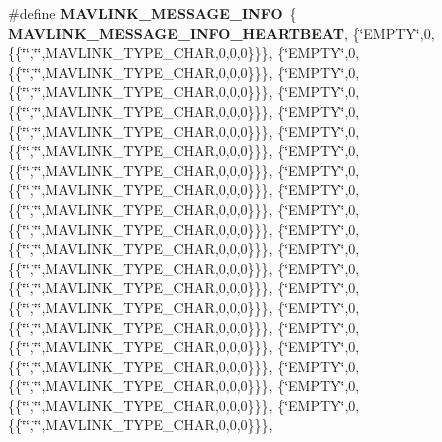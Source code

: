 \begin{DoxyCompactItemize}
\#define \textbf{ M\+A\+V\+L\+I\+N\+K\+\_\+\+M\+E\+S\+S\+A\+G\+E\+\_\+\+I\+N\+FO}~\{\textbf{ M\+A\+V\+L\+I\+N\+K\+\_\+\+M\+E\+S\+S\+A\+G\+E\+\_\+\+I\+N\+F\+O\+\_\+\+H\+E\+A\+R\+T\+B\+E\+AT}, \{\char`\"{}E\+M\+P\+TY\char`\"{},0,\{\{\char`\"{}\char`\"{},\char`\"{}\char`\"{},M\+A\+V\+L\+I\+N\+K\+\_\+\+T\+Y\+P\+E\+\_\+\+C\+H\+AR,0,0,0\}\}\}, \{\char`\"{}E\+M\+P\+TY\char`\"{},0,\{\{\char`\"{}\char`\"{},\char`\"{}\char`\"{},M\+A\+V\+L\+I\+N\+K\+\_\+\+T\+Y\+P\+E\+\_\+\+C\+H\+AR,0,0,0\}\}\}, \{\char`\"{}E\+M\+P\+TY\char`\"{},0,\{\{\char`\"{}\char`\"{},\char`\"{}\char`\"{},M\+A\+V\+L\+I\+N\+K\+\_\+\+T\+Y\+P\+E\+\_\+\+C\+H\+AR,0,0,0\}\}\}, \{\char`\"{}E\+M\+P\+TY\char`\"{},0,\{\{\char`\"{}\char`\"{},\char`\"{}\char`\"{},M\+A\+V\+L\+I\+N\+K\+\_\+\+T\+Y\+P\+E\+\_\+\+C\+H\+AR,0,0,0\}\}\}, \{\char`\"{}E\+M\+P\+TY\char`\"{},0,\{\{\char`\"{}\char`\"{},\char`\"{}\char`\"{},M\+A\+V\+L\+I\+N\+K\+\_\+\+T\+Y\+P\+E\+\_\+\+C\+H\+AR,0,0,0\}\}\}, \{\char`\"{}E\+M\+P\+TY\char`\"{},0,\{\{\char`\"{}\char`\"{},\char`\"{}\char`\"{},M\+A\+V\+L\+I\+N\+K\+\_\+\+T\+Y\+P\+E\+\_\+\+C\+H\+AR,0,0,0\}\}\}, \{\char`\"{}E\+M\+P\+TY\char`\"{},0,\{\{\char`\"{}\char`\"{},\char`\"{}\char`\"{},M\+A\+V\+L\+I\+N\+K\+\_\+\+T\+Y\+P\+E\+\_\+\+C\+H\+AR,0,0,0\}\}\}, \{\char`\"{}E\+M\+P\+TY\char`\"{},0,\{\{\char`\"{}\char`\"{},\char`\"{}\char`\"{},M\+A\+V\+L\+I\+N\+K\+\_\+\+T\+Y\+P\+E\+\_\+\+C\+H\+AR,0,0,0\}\}\}, \{\char`\"{}E\+M\+P\+TY\char`\"{},0,\{\{\char`\"{}\char`\"{},\char`\"{}\char`\"{},M\+A\+V\+L\+I\+N\+K\+\_\+\+T\+Y\+P\+E\+\_\+\+C\+H\+AR,0,0,0\}\}\}, \{\char`\"{}E\+M\+P\+TY\char`\"{},0,\{\{\char`\"{}\char`\"{},\char`\"{}\char`\"{},M\+A\+V\+L\+I\+N\+K\+\_\+\+T\+Y\+P\+E\+\_\+\+C\+H\+AR,0,0,0\}\}\}, \{\char`\"{}E\+M\+P\+TY\char`\"{},0,\{\{\char`\"{}\char`\"{},\char`\"{}\char`\"{},M\+A\+V\+L\+I\+N\+K\+\_\+\+T\+Y\+P\+E\+\_\+\+C\+H\+AR,0,0,0\}\}\}, \{\char`\"{}E\+M\+P\+TY\char`\"{},0,\{\{\char`\"{}\char`\"{},\char`\"{}\char`\"{},M\+A\+V\+L\+I\+N\+K\+\_\+\+T\+Y\+P\+E\+\_\+\+C\+H\+AR,0,0,0\}\}\}, \{\char`\"{}E\+M\+P\+TY\char`\"{},0,\{\{\char`\"{}\char`\"{},\char`\"{}\char`\"{},M\+A\+V\+L\+I\+N\+K\+\_\+\+T\+Y\+P\+E\+\_\+\+C\+H\+AR,0,0,0\}\}\}, \{\char`\"{}E\+M\+P\+TY\char`\"{},0,\{\{\char`\"{}\char`\"{},\char`\"{}\char`\"{},M\+A\+V\+L\+I\+N\+K\+\_\+\+T\+Y\+P\+E\+\_\+\+C\+H\+AR,0,0,0\}\}\}, \{\char`\"{}E\+M\+P\+TY\char`\"{},0,\{\{\char`\"{}\char`\"{},\char`\"{}\char`\"{},M\+A\+V\+L\+I\+N\+K\+\_\+\+T\+Y\+P\+E\+\_\+\+C\+H\+AR,0,0,0\}\}\}, \{\char`\"{}E\+M\+P\+TY\char`\"{},0,\{\{\char`\"{}\char`\"{},\char`\"{}\char`\"{},M\+A\+V\+L\+I\+N\+K\+\_\+\+T\+Y\+P\+E\+\_\+\+C\+H\+AR,0,0,0\}\}\}, \{\char`\"{}E\+M\+P\+TY\char`\"{},0,\{\{\char`\"{}\char`\"{},\char`\"{}\char`\"{},M\+A\+V\+L\+I\+N\+K\+\_\+\+T\+Y\+P\+E\+\_\+\+C\+H\+AR,0,0,0\}\}\}, \{\char`\"{}E\+M\+P\+TY\char`\"{},0,\{\{\char`\"{}\char`\"{},\char`\"{}\char`\"{},M\+A\+V\+L\+I\+N\+K\+\_\+\+T\+Y\+P\+E\+\_\+\+C\+H\+AR,0,0,0\}\}\}, \{\char`\"{}E\+M\+P\+TY\char`\"{},0,\{\{\char`\"{}\char`\"{},\char`\"{}\char`\"{},M\+A\+V\+L\+I\+N\+K\+\_\+\+T\+Y\+P\+E\+\_\+\+C\+H\+AR,0,0,0\}\}\}, \{\char`\"{}E\+M\+P\+TY\char`\"{},0,\{\{\char`\"{}\char`\"{},\char`\"{}\char`\"{},M\+A\+V\+L\+I\+N\+K\+\_\+\+T\+Y\+P\+E\+\_\+\+C\+H\+AR,0,0,0\}\}\}, 
\end{DoxyCompactItemize}
